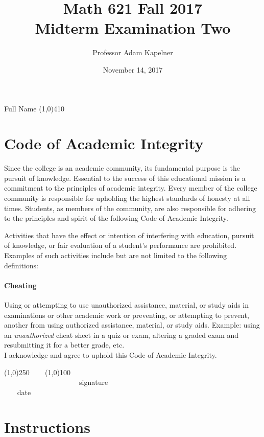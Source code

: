 \documentclass[12pt]{article}
\title{Math 621 Fall 2017 \\ Midterm Examination Two}
\author{Professor Adam Kapelner}
\date{November 14, 2017}
\begin{document}
\maketitle

\noindent Full Name \line(1,0){410}%

\thispagestyle{empty}

\section*{Code of Academic Integrity}

\footnotesize
Since the college is an academic community, its fundamental purpose is the pursuit of knowledge. Essential to the success of this educational mission is a commitment to the principles of academic integrity. Every member of the college community is responsible for upholding the highest standards of honesty at all times. Students, as members of the community, are also responsible for adhering to the principles and spirit of the following Code of Academic Integrity.

Activities that have the effect or intention of interfering with education, pursuit of knowledge, or fair evaluation of a student's performance are prohibited. Examples of such activities include but are not limited to the following definitions:

\paragraph{Cheating} Using or attempting to use unauthorized assistance, material, or study aids in examinations or other academic work or preventing, or attempting to prevent, another from using authorized assistance, material, or study aids. Example: using an \emph{unauthorized} cheat sheet in a quiz or exam, altering a graded exam and resubmitting it for a better grade, etc.
\\

\noindent I acknowledge and agree to uphold this Code of Academic Integrity. \\

\begin{center}
\line(1,0){250} ~~~ \line(1,0){100}\\
~~~~~~~~~~~~~~~~~~~~~signature~~~~~~~~~~~~~~~~~~~~~~~~~~~~~~~~~~~~~~~~~~~~~ date
\end{center}

\normalsize

\section*{Instructions}
\end{document}
